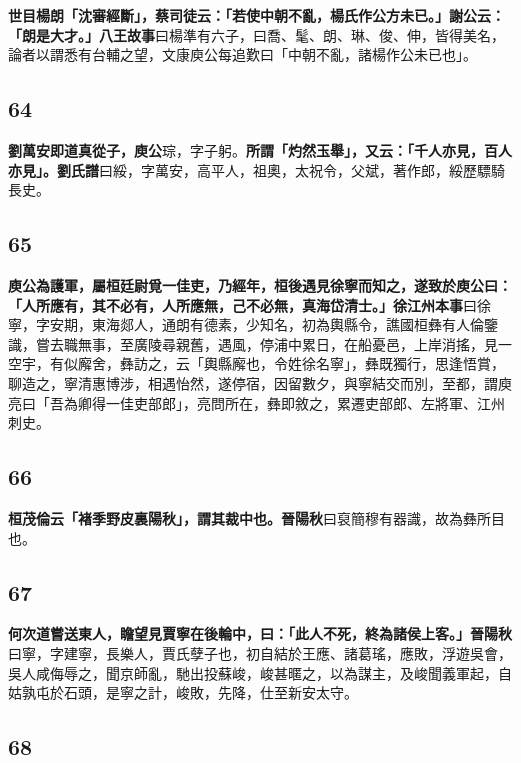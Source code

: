 \textbf{世目楊朗「沈審經斷」，蔡司徒云：「若使中朝不亂，楊氏作公方未已。」謝公云：「朗是大才。」}{\footnotesize \textbf{八王故事}曰楊準有六子，曰喬、髦、朗、琳、俊、伸，皆得美名，論者以謂悉有台輔之望，文康庾公每追歎曰「中朝不亂，諸楊作公未已也」。}

\subsection*{64}

\textbf{劉萬安即道真從子，庾公}{\footnotesize 琮，字子躬。}\textbf{所謂「灼然玉舉」，又云：「千人亦見，百人亦見」。}{\footnotesize \textbf{劉氏譜}曰綏，字萬安，高平人，祖奧，太祝令，父斌，著作郎，綏歷驃騎長史。}

\subsection*{65}

\textbf{庾公為護軍，屬桓廷尉覓一佳吏，乃經年，桓後遇見徐寧而知之，遂致於庾公曰：「人所應有，其不必有，人所應無，己不必無，真海岱清士。」}{\footnotesize \textbf{徐江州本事}曰徐寧，字安期，東海郯人，通朗有德素，少知名，初為輿縣令，譙國桓彝有人倫鑒識，嘗去職無事，至廣陵尋親舊，遇風，停浦中累日，在船憂邑，上岸消搖，見一空宇，有似廨舍，彝訪之，云「輿縣廨也，令姓徐名寧」，彝既獨行，思逢悟賞，聊造之，寧清惠博涉，相遇怡然，遂停宿，因留數夕，與寧結交而別，至都，謂庾亮曰「吾為卿得一佳吏部郎」，亮問所在，彝即敘之，累遷吏部郎、左將軍、江州刺史。}

\subsection*{66}

\textbf{桓茂倫云「褚季野皮裏陽秋」，謂其裁中也。}{\footnotesize \textbf{晉陽秋}曰裒簡穆有器識，故為彝所目也。}

\subsection*{67}

\textbf{何次道嘗送東人，瞻望見賈寧在後輪中，曰：「此人不死，終為諸侯上客。」}{\footnotesize \textbf{晉陽秋}曰寧，字建寧，長樂人，賈氏孽子也，初自結於王應、諸葛瑤，應敗，浮遊吳會，吳人咸侮辱之，聞京師亂，馳出投蘇峻，峻甚暱之，以為謀主，及峻聞義軍起，自姑孰屯於石頭，是寧之計，峻敗，先降，仕至新安太守。}

\subsection*{68}

